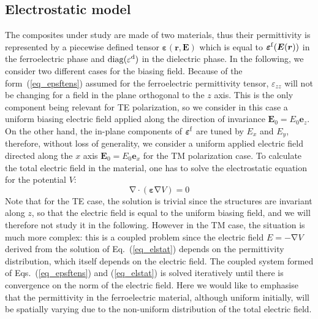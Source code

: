 \documentclass[openacc]{rsproca_new}%
\newcommand{\B}{\boldsymbol}
\newcommand{\tens}[1]{\B{#1}}
\newcommand{\grad}{\B{\mathrm{\nabla}}}
\renewcommand{\div}{\B{\mathrm{\nabla\cdotp}}}
\newcommand{\epsftens}{\tens{\varepsilon}^{\rm f}}
\newcommand{\epstens}{\tens{\varepsilon}}
\newcommand{\epsd}{\varepsilon^{\rm d}}
\newcommand{\equ}[1]{Eq.~(\ref{#1})}
\begin{document}
\subsection{Electrostatic model}
The composites under study are made of two materials, thus their permittivity
is represented by a piecewise defined tensor $\epstens(\B r, \B E)$ which is
equal to $\epsftens(\B E(\B r))$ in the ferroelectric phase and ${\rm diag}(\epsd)$
in the dielectric phase.
In the following, we consider two different cases for the biasing field.
Because of the form~(\ref{eq_epsftens}) assumed for the ferroelectric permittivity
tensor, $\varepsilon_{zz}$ will not be changing for a field in the plane orthogonal
to the $z$ axis. This is the only component
being relevant for TE polarization, so we consider in this case a uniform biasing
electric field applied along the direction of invariance $\B E_0 = E_{0} \B e_z$.
On the other hand,
the in-plane components of $\epsftens$ are tuned by $E_x$ and $E_y$, therefore,
without loss of generality,
we consider a uniform applied electric field directed along the $x$ axis
$\B E_0 = E_{0} \B e_x$ for the TM polarization case.
To calculate the total electric field in the material, one
has to solve the electrostatic equation for the potential $V$:
\begin{equation}
\div (\epstens \grad V) = 0
\label{eq_elstat}
\end{equation}
Note that for the TE case, the solution is trivial since the structures
are invariant along $z$, so that the electric field is equal to the uniform biasing field, and
we will therefore not study it in the following.
However in the TM case, the situation is much more complex: this is a coupled problem since the
electric field $E=-\grad V$ derived from the
solution of \equ{eq_elstat} depends on the permittivity distribution, which
itself depends on the electric field.
The coupled system formed
of Eqs.~(\ref{eq_epsftens}) and (\ref{eq_elstat}) is solved iteratively until there
is convergence on the norm of the electric field.
Here we would like to emphasise that the permittivity in the ferroelectric material, although
uniform initially, will be spatially varying due to the non-uniform distribution
of the total electric field.\\

\end{document}
